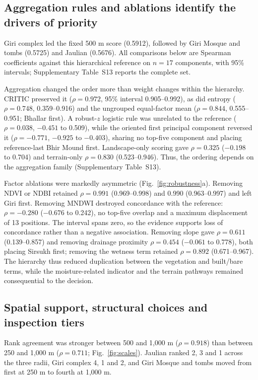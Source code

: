 \subsection{Aggregation rules and ablations identify the drivers of priority}
Giri complex led the fixed 500 m score (0.5912), followed by Giri Mosque and tombs (0.5725) and Jaulian (0.5676). All comparisons below are Spearman coefficients against this hierarchical reference on $n=17$ components, with 95\% intervals; Supplementary Table~S13 reports the complete set.

Aggregation changed the order more than weight changes within the hierarchy. CRITIC preserved it ($\rho=0.972$, 95\% interval 0.905--0.992), as did entropy ($\rho=0.748$, 0.359--0.916) and the ungrouped equal-factor mean ($\rho=0.844$, 0.555--0.951; Bhallar first). A robust-$z$ logistic rule was unrelated to the reference ($\rho=0.038$, $-0.451$ to 0.509), while the oriented first principal component reversed it ($\rho=-0.771$, $-0.925$ to $-0.403$), sharing no top-five component and placing reference-last Bhir Mound first. Landscape-only scoring gave $\rho=0.325$ ($-0.198$ to 0.704) and terrain-only $\rho=0.830$ (0.523--0.946). Thus, the ordering depends on the aggregation family (Supplementary Table~S13).

Factor ablations were markedly asymmetric (Fig.~\ref{fig:robustness}a). Removing NDVI or NDBI retained $\rho=0.991$ (0.969--0.998) and 0.990 (0.963--0.997) and left Giri first. Removing MNDWI destroyed concordance with the reference: $\rho=-0.280$ ($-0.676$ to 0.242), no top-five overlap and a maximum displacement of 13 positions. The interval spans zero, so the evidence supports loss of concordance rather than a negative association. Removing slope gave $\rho=0.611$ (0.139--0.857) and removing drainage proximity $\rho=0.454$ ($-0.061$ to 0.778), both placing Sirsukh first; removing the wetness term retained $\rho=0.892$ (0.671--0.967). The hierarchy thus reduced duplication between the vegetation and built/bare terms, while the moisture-related indicator and the terrain pathways remained consequential to the decision.

\subsection{Spatial support, structural choices and inspection tiers}
Rank agreement was stronger between 500 and 1,000 m ($\rho=0.918$) than between 250 and 1,000 m ($\rho=0.711$; Fig.~\ref{fig:scales}). Jaulian ranked 2, 3 and 1 across the three radii, Giri complex 4, 1 and 2, and Giri Mosque and tombs moved from first at 250 m to fourth at 1,000 m.

